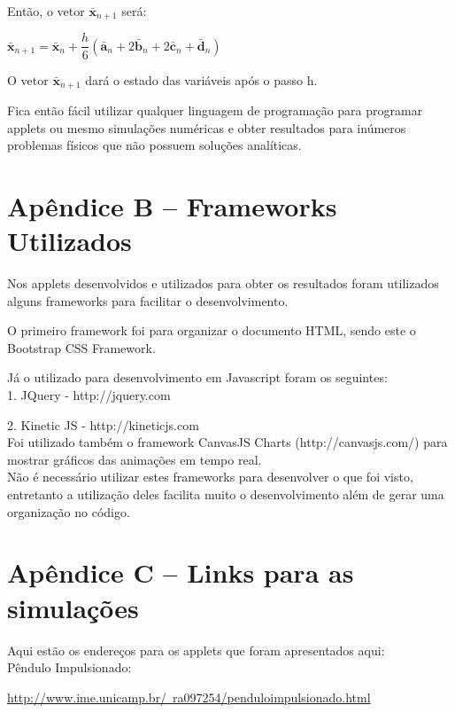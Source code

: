 \documentclass[13pt,a4paper]{report}
\begin{document}
Então, o vetor $ \bar{\textbf{x}}_{n + 1} $ será:
\begin{center}
$
\bar{\textbf{x}}_{n + 1}  = \bar{\textbf{x}}_{n}  + \dfrac{h}{6}\left( \bar{\textbf{a}}_{n} + 2\bar{\textbf{b}}_{n} + 2\bar{\textbf{c}}_{n} + \bar{\textbf{d}}_{n}\right)
$
\end{center}
O vetor $ \bar{\textbf{x}}_{n + 1} $ dará o estado das variáveis após o passo h.

Fica então fácil utilizar qualquer linguagem de programação para programar applets ou mesmo simulações numéricas e obter resultados para inúmeros problemas físicos que não possuem soluções analíticas.
\clearpage


\chapter*{Apêndice B – Frameworks Utilizados}
Nos applets desenvolvidos e utilizados para obter os
resultados foram utilizados alguns frameworks para facilitar o
desenvolvimento.

O primeiro framework foi para organizar o documento HTML,
sendo este o Bootstrap CSS Framework.

Já o utilizado para desenvolvimento em Javascript foram os
seguintes:
\\

1. JQuery  - http://jquery.com

2. Kinetic JS - http://kineticjs.com
\\

Foi utilizado também o framework CanvasJS Charts
(http://canvasjs.com/) para mostrar gráficos das animações em
tempo real.
\\

Não é necessário utilizar estes frameworks para desenvolver
o que foi visto, entretanto a utilização deles facilita muito o
desenvolvimento além de gerar uma organização no código.


\chapter*{Apêndice C – Links para as simulações}
Aqui estão os endereços para os applets que foram apresentados aqui:
\\

Pêndulo Impulsionado:

\href{http://www.ime.unicamp.br/~ra097254/penduloimpulsionado.html}{http://www.ime.unicamp.br/~ra097254/penduloimpulsionado.html}
\end{document}
